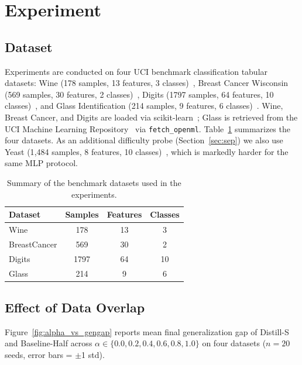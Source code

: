 \documentclass[a4paper,fleqn]{cas-dc}
\begin{document}
\section{Experiment}

\subsection{Dataset}

Experiments are conducted on four UCI benchmark classification tabular
datasets: Wine (178 samples, 13 features, 3 classes)~\citep{wine},
Breast Cancer Wisconsin (569 samples, 30 features, 2
classes)~\citep{breastcancer}, Digits (1797 samples, 64 features,
10 classes)~\citep{sklearn}, and Glass Identification (214 samples, 9 features,
6 classes)~\citep{glass}. Wine, Breast Cancer, and Digits are loaded via scikit-learn~\citep{sklearn};
Glass is retrieved from the UCI Machine Learning
Repository~\citep{uci} via \texttt{fetch\_openml}.
Table~\ref{tab:datasets} summarizes the four datasets. As an additional
difficulty probe (Section~\ref{sec:sep}) we also use Yeast (1{,}484
samples, 8 features, 10 classes)~\citep{yeast}, which is markedly harder
for the same MLP protocol.

\begin{table}[h]
  \centering
  \small
  \caption{Summary of the benchmark datasets used in the experiments.}
  \label{tab:datasets}
  \begin{tabular}{lccc}
    \toprule
    Dataset & Samples & Features & Classes \\
    \midrule
    Wine & 178 & 13 & 3 \\
    BreastCancer & 569 & 30 & 2 \\
    Digits & 1797 & 64 & 10 \\
    Glass & 214 & 9 & 6 \\
    \bottomrule
  \end{tabular}
\end{table}

\subsection{Effect of Data Overlap}
\label{Effect}



Figure~\ref{fig:alpha_vs_gengap} reports mean final generalization gap
of Distill-S and Baseline-Half across $\alpha \in
\{0.0,0.2,0.4,0.6,0.8,1.0\}$ on four datasets ($n=20$ seeds,
error bars = $\pm$1 std).
\end{document}
